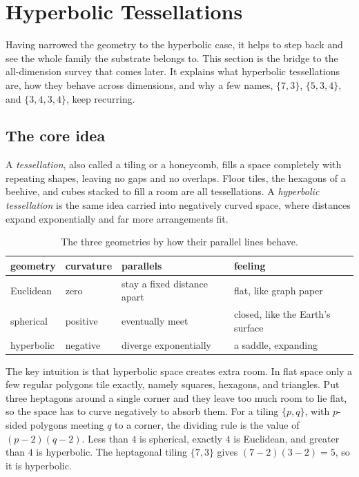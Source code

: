 \section{Hyperbolic Tessellations}

Having narrowed the geometry to the hyperbolic case, it helps to step back and see the whole family the substrate belongs to. This section is the bridge to the all-dimension survey that comes later. It explains what hyperbolic tessellations are, how they behave across dimensions, and why a few names, $\{7,3\}$, $\{5,3,4\}$, and $\{3,4,3,4\}$, keep recurring.

\subsection{The core idea}

A \emph{tessellation}, also called a tiling or a honeycomb, fills a space completely with repeating shapes, leaving no gaps and no overlaps. Floor tiles, the hexagons of a beehive, and cubes stacked to fill a room are all tessellations. A \emph{hyperbolic tessellation} is the same idea carried into negatively curved space, where distances expand exponentially and far more arrangements fit.

\begin{table}[ht]
\centering
\begin{tabular}{@{}llll@{}}
\toprule
geometry & curvature & parallels & feeling \\
\midrule
Euclidean & zero & stay a fixed distance apart & flat, like graph paper \\
spherical & positive & eventually meet & closed, like the Earth's surface \\
hyperbolic & negative & diverge exponentially & a saddle, expanding \\
\bottomrule
\end{tabular}
\caption{The three geometries by how their parallel lines behave.}
\end{table}

The key intuition is that hyperbolic space creates extra room. In flat space only a few regular polygons tile exactly, namely squares, hexagons, and triangles. Put three heptagons around a single corner and they leave too much room to lie flat, so the space has to curve negatively to absorb them. For a tiling $\{p,q\}$, with $p$-sided polygons meeting $q$ to a corner, the dividing rule is the value of $(p-2)(q-2)$. Less than $4$ is spherical, exactly $4$ is Euclidean, and greater than $4$ is hyperbolic. The heptagonal tiling $\{7,3\}$ gives $(7-2)(3-2) = 5$, so it is hyperbolic.

